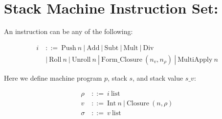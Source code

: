 \documentclass[11pt]{article}
\begin{document}
\section*{Stack Machine Instruction Set:}

An instruction can be any of the following:

\begin{align*}
    i\ &::=\ \text {Push}\ n\ |\ \text {Add}\ |\ \text {Subt}\ |\ \text {Mult}\ |\ \text {Div}\\
    & |\ \text{Roll}\ n\ |\ \text {Unroll}\ n\ |\ \text{Form\_Closure}\ (n_v, n_{\rho})\ |\ \text{MultiApply}\ n
\end{align*}

Here we define machine program $p$, stack $s$, and stack value $s\_v$:

\begin{align*}
    \rho\ &::=\ i\ \text{list}\\
    v\ &::=\ \text {Int}\ n\ |\ \text {Closure}\ (n, \rho) \\
    \sigma &::=\ v\ \text{list}\\
\end{align*}
\end{document}

